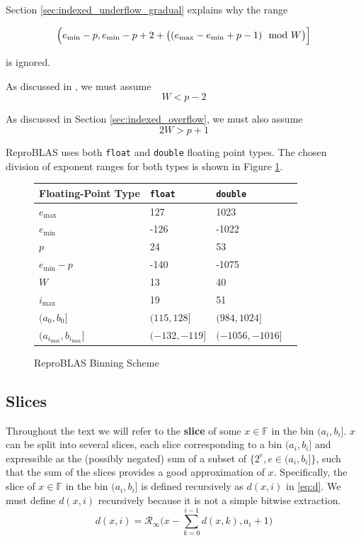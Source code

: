 \documentclass[12pt]{article}
\providecommand{\F}{\ensuremath{\mathbb{F}}}
\providecommand{\min}{\ensuremath{\text{min}}}
\providecommand{\max}{\ensuremath{\text{max}}}
\providecommand{\roundtonearestinfty}{\ensuremath{\mathcal{R}_\text{$\infty$}}}
\theoremstyle{definition}
\numberwithin{equation}{section}
\numberwithin{figure}{section}
\begin{document}
    Section \ref{sec:indexed_underflow_gradual} explains why the range

    \begin{equation*}
    \Bigl(e_{\min} - p, e_{\min} - p + 2 + \bigl((e_{\max} - e_{\min} + p - 1) \mod W\bigr)\Bigr]
    \end{equation*}

    is ignored.

    As discussed in \cite{repsum}, we must assume
    \begin{equation}
      W < p - 2
      \label{eq:wupper}
    \end{equation}

    As discussed in Section \ref{sec:indexed_overflow}, we must also assume
    \begin{equation}
      2 W > p + 1
      \label{eq:wlower}
    \end{equation}

    ReproBLAS uses both \texttt{float} and \texttt{double} floating point types. The chosen division of exponent ranges for both types is shown in Figure \ref{fig:bins}.
    \begin{figure}[H] \centering\begin{tabular}{ | l | l | l | p{5cm} |} \hline Floating-Point Type & \texttt{float} & \texttt{double}\\ \hline $e_{\max}$ & 127 & 1023\\ \hline $e_{\min}$ &  -126 & -1022 \\ \hline $p$ & 24 & 53 \\ \hline $e_{\min} - p$ & -140 & -1075 \\ \hline $W$ & 13 & 40 \\ \hline $i_{\max}$ & 19 & 51 \\ \hline $(a_0, b_0]$ & $(115, 128]$ & $(984, 1024]$\\ \hline $(a_{i_{\max}}, b_{i_{\max}}]$ & $(-132, -119]$ & $(-1056, -1016]$ \\ \hline\end{tabular} \caption{ReproBLAS Binning Scheme}\label{fig:bins}\end{figure}

  \subsection{Slices}
    \label{sec:binning_slices}
    Throughout the text we will refer to the \textbf{slice} of some $x \in \F$ in the bin $(a_i, b_i]$. $x$ can be split into several slices, each slice corresponding to a bin $(a_i, b_i]$ and expressible as the (possibly negated) sum of a subset of $\{2^e, e \in (a_i, b_i]\}$, such that the sum of the slices provides a good approximation of $x$. Specifically, the slice of $x \in \F$ in the bin $(a_i, b_i]$ is defined recursively as $d(x, i)$ in \eqref{eq:d}. We must define $d(x, i)$ recursively because it is not a simple bitwise extraction.
    \begin{equation}
      d(x, i) = \roundtonearestinfty\bigl(x - \sum\limits_{k=0}^{i - 1}d(x,k), a_i + 1\bigr)
      \label{eq:d}
    \end{equation}
\end{document}

